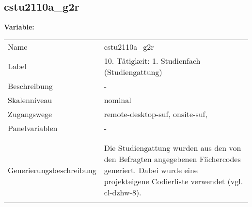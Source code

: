 	
	
	\subsection{cstu2110a\_g2r}
	\label{subSection:cstu2110a_g2r}

	\noindent\textbf{Variable:}\\
		\begin{tabular}{lL{11.3cm}}
			\label{tableVariable:cstu2110a_g2r}
			Name & cstu2110a\_g2r \\
			Label & 10. Tätigkeit: 1. Studienfach (Studiengattung) \\
			Beschreibung & - \\
			Skalenniveau & nominal \\
			Zugangswege &
				remote-desktop-suf,
				onsite-suf,
 \\
			Panelvariablen & -
			 \\
			 \\
 \\
					Generierungsbeschreibung & Die Studiengattung wurden aus den von den Befragten angegebenen Fächercodes generiert.  Dabei wurde eine projekteigene Codierliste verwendet (vgl. cl-dzhw-8).
				 \\	
			 \\
		\end{tabular}






